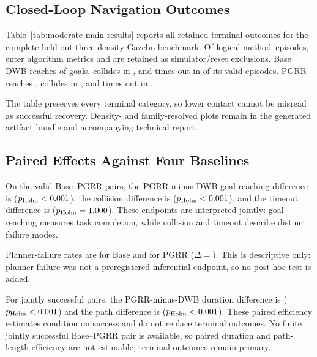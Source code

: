 \ifmoderateresults
\subsection{Closed-Loop Navigation Outcomes}
Table~\ref{tab:moderate-main-results} reports all retained terminal outcomes for
the complete held-out three-density Gazebo benchmark.  Of \ModerateEpisodeCount{} logical
method--episodes, \ModerateValidEpisodeCount{} enter algorithm metrics and
\ModerateExcludedEpisodeCount{} are retained as simulator/reset exclusions.
Base DWB reaches \ModerateBaseSuccessRate{} of goals, collides in
\ModerateBaseCollisionRate{}, and times out in \ModerateBaseTimeoutRate{} of
its valid episodes.  PGRR reaches \ModeratePGRRSuccessRate{}, collides in
\ModeratePGRRCollisionRate{}, and times out in \ModeratePGRRTimeoutRate{}.



The table preserves every terminal category, so lower contact cannot be
misread as successful recovery.  Density- and family-resolved plots remain in
the generated artifact bundle and accompanying technical report.

\subsection{Paired Effects Against Four Baselines}
On the \ModerateBasePGRRValidPairCount{} valid Base--PGRR pairs, the PGRR-minus-DWB
goal-reaching difference is \ModeratePGRRSuccessDifference{}
($p_{\mathrm{Holm}}<0.001$), the collision
difference is \ModeratePGRRCollisionDifference{}
($p_{\mathrm{Holm}}<0.001$), and the timeout
difference is \ModeratePGRRTimeoutDifference{}
($p_{\mathrm{Holm}}=1.000$).  These endpoints are
interpreted jointly: goal reaching measures task completion, while collision
and timeout describe distinct failure modes.

Planner-failure rates are \ModerateBasePlannerFailureRate{} for Base and
\ModeratePGRRPlannerFailureRate{} for PGRR
($\Delta=$\ModeratePGRRPlannerFailureDifference{}).  This is descriptive only:
planner failure was not a preregistered inferential endpoint, so no post-hoc
test is added.

\ifModerateJointSuccessEfficiencyAvailable
For \ModerateBasePGRRJointSuccessPairCount{} jointly successful pairs, the
PGRR-minus-DWB duration difference is \ModeratePGRRDurationDifference{}
($p_{\mathrm{Holm}}<0.001$) and the path difference
is \ModeratePGRRPathLengthDifference{}
($p_{\mathrm{Holm}}<0.001$).  These paired
efficiency estimates condition on success and do not replace terminal outcomes.
\else
No finite jointly successful Base--PGRR pair is available, so paired duration
and path-length efficiency are not estimable; terminal outcomes remain primary.
\fi

